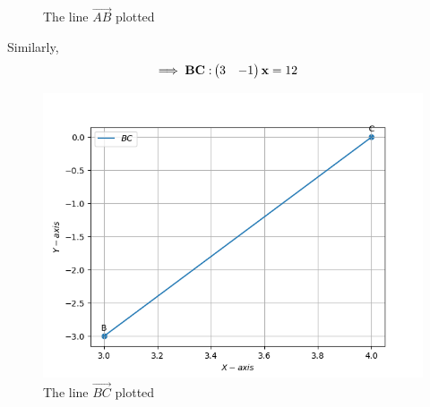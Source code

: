 \documentclass[10pt]{book}
\begin{document}
\begin{enumerate}[label=\thesection.\arabic*.,ref=\thesection.\theenumi]
\begin{figure}[H]
\caption{ The line $\vec{AB}$ plotted}
\label{fig:line AB}
\end{figure}
Similarly,
\begin{align}
	\implies
	\mathbf{BC:} \begin{pmatrix}3 & -1\end{pmatrix}\mathbf{x} &= 12
\end{align}
\begin{figure}[H]
\includegraphics [width=\columnwidth]{figs/BC_line.png}
\caption{ The line $\vec{BC}$ plotted}
\label{fig:line BC}
\end{figure}


\end{enumerate}
\end{document}
